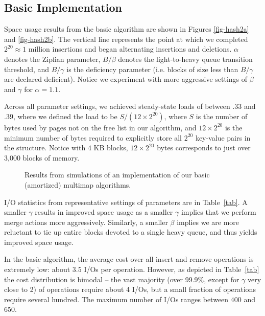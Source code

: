 \documentclass[11pt,letterpaper]{article}
\begin{document}
\subsection{Basic Implementation}
\label{exp:am}

Space usage results from the basic algorithm are shown in Figures \ref{fig-hash2a} and \ref{fig-hash2b}.  The vertical line represents the point at which we completed $2^{20} \approx 1$ million insertions and began alternating insertions and deletions. $\alpha$ denotes the Zipfian parameter, $B/\beta$ denotes the light-to-heavy queue transition threshold, and $B/\gamma$ is the deficiency parameter (i.e. blocks of size less than $B/\gamma $ are declared deficient). Notice we experiment with more aggressive settings of $\beta$ and $\gamma$ for $\alpha=1.1$.  

Across all parameter settings, we achieved steady-state loads of between $.33$ and $.39$, where we defined the load to be $S/(12 \times 2^{20})$, where $S$ is the number of bytes used by pages not on the free list in our algorithm, and $12 \times 2^{20}$ is the minimum number of bytes required to explicitly store all $2^{20}$ key-value pairs in the structure. Notice with $4$ KB blocks, $12 \times 2^{20}$ bytes corresponds to just over 3,000 blocks of memory. 



\newlength{\figwidth}
\setlength{\figwidth}{0.46\textwidth}
\begin{figure*}[!h]
\centering
\subfigure[Space usage for $\alpha=.99$.]
{
\texttt{[image: block\_usage\_hash2\_alpha=099.pdf]}
\label{fig-hash2a}
}
\subfigure[center][Space usage for $\alpha=1.1$.]
{
\texttt{[image: block\_usage\_hash2\_alpha=11.pdf]}
\label{fig-hash2b}
}
\caption{Results from simulations of an implementation of our basic (amortized) multimap algorithms.}
\end{figure*}


I/O statistics from representative settings of parameters are in Table~\ref{tab}. 
A smaller $\gamma$ results in improved space usage as a smaller $\gamma$ implies that we perform merge actions more aggressively. Similarly, a smaller $\beta$ implies we are more reluctant to tie up entire blocks devoted to a single heavy queue, and thus yields improved space usage. 

In the basic algorithm, the average cost over all insert and remove operations is extremely low: about $3.5$ I/Os per operation. However, as depicted in Table~\ref{tab} the cost distribution is bimodal -- the vast majority (over 99.9\%, except for $\gamma$ very close to 2) of operations require about 4 I/Os, but a small fraction of operations require several hundred. The maximum number of I/Os ranges between $400$ and $650$.
\end{document}
